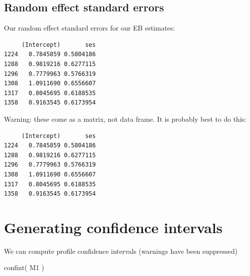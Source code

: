 \documentclass[
  letterpaper,
  DIV=11,
  numbers=noendperiod]{scrreprt}
\newenvironment{Shaded}{\begin{snugshade}}{\end{snugshade}}
\newcommand{\FunctionTok}[1]{\textcolor[rgb]{0.02,0.16,0.49}{#1}}
\newcommand{\NormalTok}[1]{\textcolor[rgb]{0.00,0.44,0.13}{#1}}
\newcommand{\OtherTok}[1]{\textcolor[rgb]{0.00,0.44,0.13}{#1}}
\newcommand{\SpecialCharTok}[1]{\textcolor[rgb]{0.25,0.44,0.63}{#1}}
\begin{document}
\hypertarget{random-effect-standard-errors}{%
\subsection{Random effect standard
errors}\label{random-effect-standard-errors}}

Our random effect standard errors for our EB estimates:

\begin{Shaded}
\end{Shaded}

\begin{verbatim}
     (Intercept)       ses
1224   0.7845859 0.5804186
1288   0.9819216 0.6277115
1296   0.7779963 0.5766319
1308   1.0911690 0.6556607
1317   0.8045695 0.6188535
1358   0.9163545 0.6173954
\end{verbatim}

Warning: these come as a matrix, not data frame. It is probably best to
do this:

\begin{Shaded}
\end{Shaded}

\begin{verbatim}
     (Intercept)       ses
1224   0.7845859 0.5804186
1288   0.9819216 0.6277115
1296   0.7779963 0.5766319
1308   1.0911690 0.6556607
1317   0.8045695 0.6188535
1358   0.9163545 0.6173954
\end{verbatim}

\hypertarget{generating-confidence-intervals}{%
\section{Generating confidence
intervals}\label{generating-confidence-intervals}}

We can compute profile confidence intervals (warnings have been
suppressed)

\begin{Shaded}
\begin{Highlighting}[]
\FunctionTok{confint}\NormalTok{( M1 )}
\end{Highlighting}
\end{Shaded}
\end{document}
